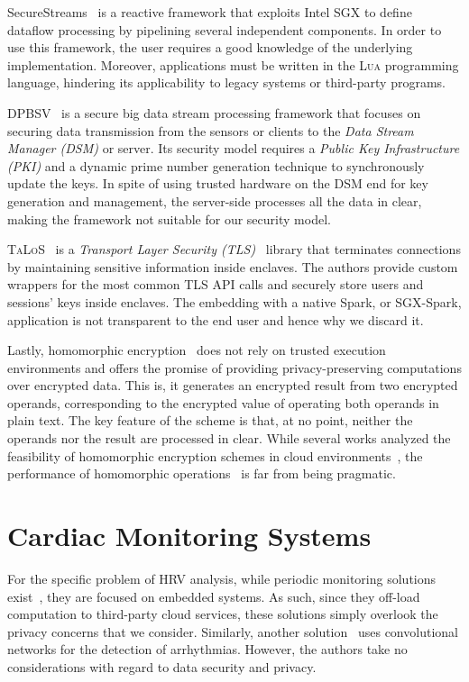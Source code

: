 SecureStreams~\cite{Havet2017} is a reactive framework that exploits Intel SGX to define dataflow processing by pipelining several independent components. 
In order to use this framework, the user requires a good knowledge of the underlying implementation. 
Moreover, applications must be written in the \textsc{Lua} programming language, hindering its applicability to legacy systems or third-party programs.

\textsc{DPBSV}~\cite{Puthal2015} is a secure big data stream processing framework that focuses on securing data transmission from the sensors or clients to the \textit{Data Stream Manager (DSM)} or server. 
Its security model requires a \textit{Public Key Infrastructure (PKI)} and a dynamic prime number generation technique to synchronously update the keys. 
In spite of using trusted hardware on the DSM end for key generation and management, the server-side processes all the data in clear, making the framework not suitable for our security model. 

\textsc{TaLoS}~\cite{Aublin2017} is a \textit{Transport Layer Security (TLS)}~\cite{Dierks2008} library that terminates connections by maintaining sensitive information inside enclaves. 
The authors provide custom wrappers for the most common \textsc{TLS} API calls and securely store users and sessions' keys inside enclaves.
The embedding with a native Spark, or SGX-Spark, application is not transparent to the end user and hence why we discard it.

Lastly, homomorphic encryption~\cite{Gentry2009} does not rely on trusted execution environments and offers the promise of providing privacy-preserving computations over encrypted data.
This is, it generates an encrypted result from two encrypted operands, corresponding to the encrypted value of operating both operands in plain text.
The key feature of the scheme is that, at no point, neither the operands nor the result are processed in clear.
While several works analyzed the feasibility of homomorphic encryption schemes in cloud environments~\cite{Tetali2013,Stephen2016}, the performance of homomorphic operations~\cite{Gottel2018} is far from being pragmatic.

\section{Cardiac Monitoring Systems} \label{sec:related:cardiac}
For the specific problem of HRV analysis, while periodic monitoring solutions exist~\cite{Renevey2018}, they are focused on embedded systems.
As such, since they off-load computation to third-party cloud services, these solutions simply overlook the privacy concerns that we consider.
Similarly, another solution~\cite{VanZaen2019} uses convolutional networks for the detection of arrhythmias.
However, the authors take no considerations with regard to data security and privacy.

